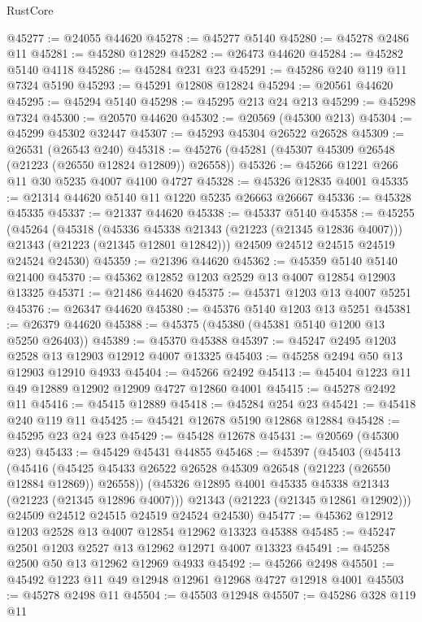 \begin{lexlean}{RustCore}
\begin{coremodule}
@45277 := @24055 @44620
@45278 := @45277 @5140
@45280 := @45278 @2486 @11
@45281 := @45280 @12829
@45282 := @26473 @44620
@45284 := @45282 @5140 @4118
@45286 := @45284 @231 @23
@45291 := @45286 @240 @119 @11 @7324 @5190
@45293 := @45291 @12808 @12824
@45294 := @20561 @44620
@45295 := @45294 @5140
@45298 := @45295 @213 @24 @213
@45299 := @45298 @7324
@45300 := @20570 @44620
@45302 := @20569 (@45300 @213)
@45304 := @45299 @45302 @32447
@45307 := @45293 @45304 @26522 @26528
@45309 := @26531 (@26543 @240)
@45318 := @45276 (@45281 (@45307 @45309 @26548 (@21223 (@26550 @12824 @12809)) @26558))
@45326 := @45266 @1221 @266 @11 @30 @5235 @4007 @4100 @4727
@45328 := @45326 @12835 @4001
@45335 := @21314 @44620 @5140 @11 @1220 @5235 @26663 @26667
@45336 := @45328 @45335
@45337 := @21337 @44620
@45338 := @45337 @5140
@45358 := @45255
    (@45264
      (@45318
        (@45336 @45338 @21343 (@21223 (@21345 @12836 @4007)))
        @21343
        (@21223 (@21345 @12801 @12842)))
      @24509
      @24512
      @24515
      @24519
      @24524
      @24530)
@45359 := @21396 @44620
@45362 := @45359 @5140 @5140 @21400
@45370 := @45362 @12852 @1203 @2529 @13 @4007 @12854 @12903 @13325
@45371 := @21486 @44620
@45375 := @45371 @1203 @13 @4007 @5251
@45376 := @26347 @44620
@45380 := @45376 @5140 @1203 @13 @5251
@45381 := @26379 @44620
@45388 := @45375 (@45380 (@45381 @5140 @1200 @13 @5250 @26403))
@45389 := @45370 @45388
@45397 := @45247 @2495 @1203 @2528 @13 @12903 @12912 @4007 @13325
@45403 := @45258 @2494 @50 @13 @12903 @12910 @4933
@45404 := @45266 @2492
@45413 := @45404 @1223 @11 @49 @12889 @12902 @12909 @4727 @12860 @4001
@45415 := @45278 @2492 @11
@45416 := @45415 @12889
@45418 := @45284 @254 @23
@45421 := @45418 @240 @119 @11
@45425 := @45421 @12678 @5190 @12868 @12884
@45428 := @45295 @23 @24 @23
@45429 := @45428 @12678
@45431 := @20569 (@45300 @23)
@45433 := @45429 @45431 @44855
@45468 := @45397
    (@45403
      (@45413
        (@45416 (@45425 @45433 @26522 @26528 @45309 @26548 (@21223 (@26550 @12884 @12869)) @26558))
        (@45326 @12895 @4001 @45335 @45338 @21343 (@21223 (@21345 @12896 @4007)))
        @21343
        (@21223 (@21345 @12861 @12902)))
      @24509
      @24512
      @24515
      @24519
      @24524
      @24530)
@45477 := @45362 @12912 @1203 @2528 @13 @4007 @12854 @12962 @13323 @45388
@45485 := @45247 @2501 @1203 @2527 @13 @12962 @12971 @4007 @13323
@45491 := @45258 @2500 @50 @13 @12962 @12969 @4933
@45492 := @45266 @2498
@45501 := @45492 @1223 @11 @49 @12948 @12961 @12968 @4727 @12918 @4001
@45503 := @45278 @2498 @11
@45504 := @45503 @12948
@45507 := @45286 @328 @119 @11

\end{coremodule}
\end{lexlean}
